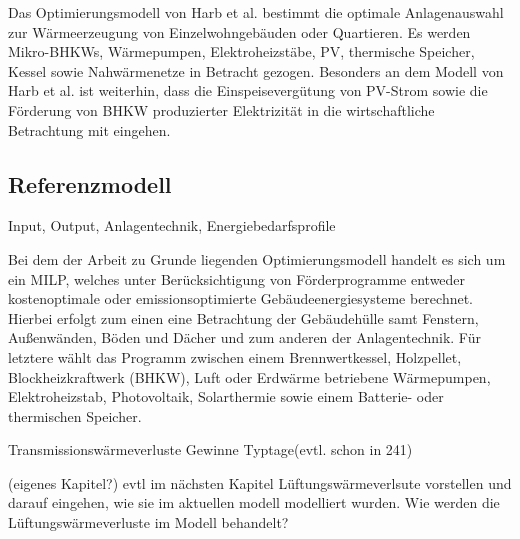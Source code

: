 Das Optimierungsmodell von Harb et al. \cite{Harb.2016} bestimmt die optimale Anlagenauswahl zur Wärmeerzeugung von Einzelwohngebäuden oder Quartieren.
Es werden Mikro-BHKWs, Wärmepumpen, Elektroheizstäbe, PV, thermische Speicher, Kessel sowie Nahwärmenetze in Betracht gezogen.
Besonders an dem Modell von Harb et al. ist weiterhin, dass die Einspeisevergütung von PV-Strom sowie die Förderung von BHKW produzierter Elektrizität in die wirtschaftliche Betrachtung mit eingehen.




\subsection{Referenzmodell}
\label{subsec:Sektion 252}
Input, Output, Anlagentechnik, Energiebedarfsprofile

Bei dem der Arbeit zu Grunde liegenden Optimierungsmodell handelt es sich um ein MILP, welches unter Berücksichtigung von Förderprogramme entweder kostenoptimale oder emissionsoptimierte Gebäudeenergiesysteme berechnet.
Hierbei erfolgt zum einen eine Betrachtung der Gebäudehülle samt Fenstern, Außenwänden, Böden und Dächer und zum anderen der Anlagentechnik.
Für letztere wählt das Programm zwischen einem Brennwertkessel, Holzpellet, Blockheizkraftwerk (BHKW), Luft oder Erdwärme betriebene Wärmepumpen, Elektroheizstab, Photovoltaik, Solarthermie sowie einem Batterie- oder thermischen Speicher.



Transmissionswärmeverluste
Gewinne
Typtage(evtl. schon in 241)



(eigenes Kapitel?) evtl im nächsten Kapitel Lüftungswärmeverlsute vorstellen und darauf eingehen, wie sie im aktuellen modell modelliert wurden.
Wie werden die Lüftungswärmeverluste im Modell behandelt?















